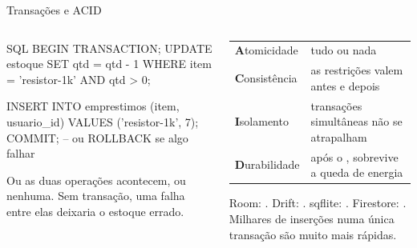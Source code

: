 \documentclass[aspectratio=169,10pt]{beamer}
\begin{document}
\begin{frame}[fragile]{Transações e ACID}
  \begin{columns}[T]
    \begin{column}{0.5\textwidth}
\begin{codigo}[title=Empréstimo de componente]{SQL}
BEGIN TRANSACTION;
  UPDATE estoque
  SET    qtd = qtd - 1
  WHERE  item = 'resistor-1k' AND qtd > 0;

  INSERT INTO emprestimos (item, usuario_id)
  VALUES ('resistor-1k', 7);
COMMIT;      -- ou ROLLBACK se algo falhar
\end{codigo}
      \begin{caixaambar}
        Ou as duas operações acontecem, ou nenhuma. Sem transação, uma falha entre elas deixaria o estoque errado.
      \end{caixaambar}
    \end{column}
    \begin{column}{0.48\textwidth}
      \scriptsize
      \begin{tabularx}{\linewidth}{@{}l L@{}}
        \toprule
         &  \\
        \midrule
        \textbf{A}tomicidade & tudo ou nada \\
        \textbf{C}onsistência & as restrições valem antes e depois \\
        \textbf{I}solamento & transações simultâneas não se atrapalham \\
        \textbf{D}urabilidade & após o , sobrevive a queda de energia \\
        \bottomrule
      \end{tabularx}
      \begin{dica}[No app]
        Room: . Drift: . sqflite: . Firestore: . Milhares de inserções numa única transação são muito mais rápidas.
      \end{dica}
    \end{column}
  \end{columns}
\end{frame}
\end{document}
